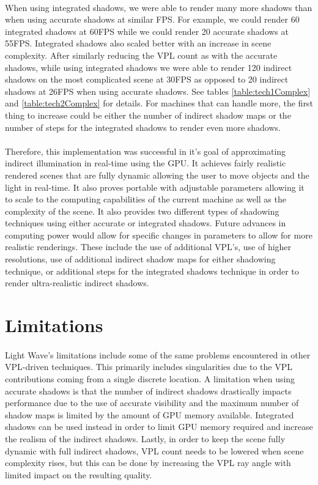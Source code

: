 \paragraph{}
When using integrated shadows, we were able to render many more shadows than when using accurate shadows at similar FPS.  For example, we could render 60 integrated shadows at 60FPS while we could render 20 accurate shadows at 55FPS.  Integrated shadows also scaled better with an increase in scene complexity.  After similarly reducing the VPL count as with the accurate shadows, while using integrated shadows we were able to render 120 indirect shadows on the most complicated scene at 30FPS as opposed to 20 indirect shadows at 26FPS when using accurate shadows.  See tables \ref{table:tech1Complex} and \ref{table:tech2Complex} for details.  For machines that can handle more, the first thing to increase could be either the number of indirect shadow maps or the number of steps for the integrated shadows to render even more shadows.

\paragraph{}
Therefore, this implementation was successful in it's goal of approximating indirect illumination in real-time using the GPU.  It achieves fairly realistic rendered scenes that are fully dynamic allowing the user to move objects and the light in real-time.  It also proves portable with adjustable parameters allowing it to scale to the computing capabilities of the current machine as well as the complexity of the scene.  It also provides two different types of shadowing techniques using either accurate or integrated shadows.  Future advances in computing power would allow for specific changes in parameters to allow for more realistic renderings.  These include the use of additional VPL's, use of higher resolutions, use of additional indirect shadow maps for either shadowing technique, or additional steps for the integrated shadows technique in order to render ultra-realistic indirect shadows.

\section{Limitations}
\paragraph{}
Light Wave's limitations include some of the same problems encountered in other VPL-driven techniques.  This primarily includes singularities due to the VPL contributions coming from a single discrete location.  A limitation when using accurate shadows is that the number of indirect shadows drastically impacts performance due to the use of accurate visibility and the maximum number of shadow maps is limited by the amount of GPU memory available.  Integrated shadows can be used instead in order to limit GPU memory required and increase the realism of the indirect shadows.  Lastly, in order to keep the scene fully dynamic with full indirect shadows, VPL count needs to be lowered when scene complexity rises, but this can be done by increasing the VPL ray angle with limited impact on the resulting quality.

